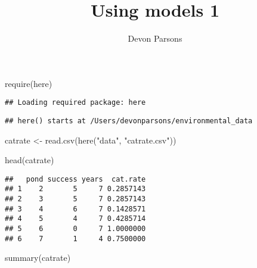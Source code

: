 \documentclass[
]{article}
\title{Using models 1}
\author{Devon Parsons}
\date{}
\newenvironment{Shaded}{\begin{snugshade}}{\end{snugshade}}
\newcommand{\AttributeTok}[1]{\textcolor[rgb]{0.77,0.63,0.00}{#1}}
\newcommand{\ConstantTok}[1]{\textcolor[rgb]{0.00,0.00,0.00}{#1}}
\newcommand{\FunctionTok}[1]{\textcolor[rgb]{0.00,0.00,0.00}{#1}}
\newcommand{\NormalTok}[1]{#1}
\newcommand{\OtherTok}[1]{\textcolor[rgb]{0.56,0.35,0.01}{#1}}
\newcommand{\SpecialCharTok}[1]{\textcolor[rgb]{0.00,0.00,0.00}{#1}}
\newcommand{\StringTok}[1]{\textcolor[rgb]{0.31,0.60,0.02}{#1}}
\begin{document}
\maketitle

{
\setcounter{tocdepth}{2}
\tableofcontents
}
\begin{Shaded}
\end{Shaded}

\begin{Shaded}
\begin{Highlighting}[]
\FunctionTok{require}\NormalTok{(here)}
\end{Highlighting}
\end{Shaded}

\begin{verbatim}
## Loading required package: here
\end{verbatim}

\begin{verbatim}
## here() starts at /Users/devonparsons/environmental_data
\end{verbatim}

\begin{Shaded}
\begin{Highlighting}[]
\NormalTok{catrate }\OtherTok{\textless{}{-}} \FunctionTok{read.csv}\NormalTok{(}\FunctionTok{here}\NormalTok{(}\StringTok{"data"}\NormalTok{, }\StringTok{"catrate.csv"}\NormalTok{))}

\FunctionTok{head}\NormalTok{(catrate)}
\end{Highlighting}
\end{Shaded}

\begin{verbatim}
##   pond success years  cat.rate
## 1    2       5     7 0.2857143
## 2    3       5     7 0.2857143
## 3    4       6     7 0.1428571
## 4    5       4     7 0.4285714
## 5    6       0     7 1.0000000
## 6    7       1     4 0.7500000
\end{verbatim}

\begin{Shaded}
\begin{Highlighting}[]
\FunctionTok{summary}\NormalTok{(catrate)}
\end{Highlighting}
\end{Shaded}
\end{document}
